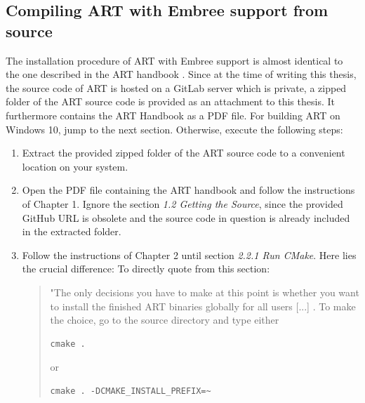 \subsection{Compiling ART with Embree support from source}
\label{art}


The installation procedure of ART with Embree support is almost identical to the one described in the ART handbook \cite{arthandbook}. Since at the time of writing this thesis, the source code of ART is hosted on a GitLab server which is private, a zipped folder of the ART source code is provided as an attachment to this thesis. It furthermore contains the ART Handbook as a PDF file. For building ART on Windows 10, jump to the next section. Otherwise, execute the following steps:

\begin{enumerate}
	
	\item Extract the provided zipped folder of the ART source code to a convenient location on your system.
	
	\item Open the PDF file containing the ART handbook and follow the instructions of Chapter 1. Ignore the section \emph{1.2 Getting the Source}, since the provided GitHub URL is obsolete and the source code in question is already included in the extracted folder. 
	
	\item Follow the instructions of Chapter 2 until section \emph{2.2.1 Run CMake}. Here lies the crucial difference:
	To directly quote from this section: 
	\begin{quote}
	"The  only  decisions  you  have  to  make  at  this  point  is  whether  you  want  to  install  the  finished  ART binaries globally for all users [...] . To make the choice, go to the source directory and type either 
\begin{Verbatim}
cmake .
\end{Verbatim}
	or
\begin{Verbatim}
cmake . -DCMAKE_INSTALL_PREFIX=~
\end{Verbatim}
	\end{quote}
	

\end{enumerate}
